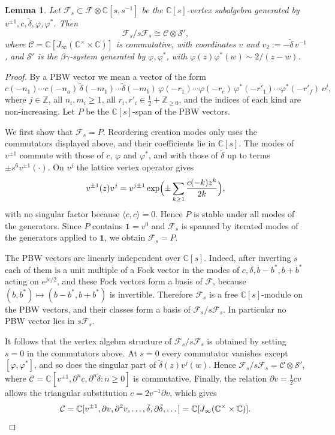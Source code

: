 \documentclass[11pt]{amsart}
\newtheorem{lemma}[theorem]{Lemma}
\theoremstyle{definition}
\theoremstyle{remark}
\begin{document}
{{\begin{lemma}\label{lem:fam}
	Let $\mathcal{F}_s\subset\mathcal{F}\otimes\mathbb{C}[s,s^{-1}]$ be the $\mathbb{C}[s]$-vertex
	subalgebra generated by $v^{\pm1},c,\tilde\delta,\varphi,\varphi^*$. Then
	\[
	\mathcal{F}_s/s\mathcal{F}_s\cong\mathcal{C}\otimes\mathcal{S}',
	\]
	where $\mathcal{C}=\mathbb{C}[J_\infty(\mathbb{C}^\times\times\mathbb{C})]$ is commutative, with
	coordinates $v$ and $v_2:=-\tilde\delta\,v^{-1}$, and $\mathcal{S}'$ is the
	$\beta\gamma$-system generated by $\varphi,\varphi^*$, with $\varphi(z)\varphi^*(w)\sim2/(z-w)$.
\end{lemma}
\begin{proof}
	By a PBW vector we mean a vector of the form
	\[
	c(-n_1)\cdots c(-n_a)\,\tilde\delta(-m_1)\cdots\tilde\delta(-m_b)\,
	\varphi(-r_1)\cdots\varphi(-r_e)\,\varphi^*(-r'_1)\cdots\varphi^*(-r'_f)\,v^{j},
	\]
	where $j\in\mathbb{Z}$, all $n_i,m_i\ge1$, all $r_i,r'_i\in\tfrac12+\mathbb{Z}_{\ge0}$, and the
	indices of each kind are non-increasing. Let $P$ be the $\mathbb{C}[s]$-span of the PBW vectors.
	
	We first show that $\mathcal{F}_s=P$. Reordering creation modes only uses the commutators
	displayed above, and their coefficients lie in $\mathbb{C}[s]$. The modes of $v^{\pm1}$ commute
	with those of $c$, $\varphi$ and $\varphi^*$, and with those of $\tilde\delta$ up to terms
	$\pm s^6v^{\pm1}(\cdot)$. On $v^j$ the lattice vertex operator gives
	\[
	v^{\pm1}(z)v^j=v^{j\pm1}\exp\Bigl(\pm\sum_{k\ge1}\frac{c(-k)z^k}{2k}\Bigr),
	\]
	with no singular factor because $\langle c,c\rangle=0$. Hence $P$ is stable under all modes of
	the generators. Since $P$ contains $\mathbf 1=v^0$ and $\mathcal{F}_s$ is spanned by iterated
	modes of the generators applied to $\mathbf 1$, we obtain $\mathcal{F}_s=P$.
	
	The PBW vectors are linearly independent over $\mathbb{C}[s]$. Indeed, after inverting $s$ each
	of them is a unit multiple of a Fock vector in the modes of $c,\delta,b-b^*,b+b^*$ acting on
	$e^{jc/2}$, and these Fock vectors form a basis of $\mathcal{F}$, because
	$(b,b^*)\mapsto(b-b^*,b+b^*)$ is invertible. Therefore $\mathcal{F}_s$ is a free
	$\mathbb{C}[s]$-module on the PBW vectors, and their classes form a basis of
	$\mathcal{F}_s/s\mathcal{F}_s$. In particular no PBW vector lies in $s\mathcal{F}_s$.
	
	It follows that the vertex algebra structure of $\mathcal{F}_s/s\mathcal{F}_s$ is obtained by
	setting $s=0$ in the commutators above. At $s=0$ every commutator vanishes except
	$[\varphi,\varphi^*]$, and so does the singular part of $\tilde\delta(z)v^j(w)$. Hence
	$\mathcal{F}_s/s\mathcal{F}_s=\mathcal{C}\otimes\mathcal{S}'$, where
	$\mathcal{C}=\mathbb{C}[v^{\pm1},\partial^nc,\partial^n\tilde\delta:n\ge0]$ is commutative.
	Finally, the relation $\partial v=\tfrac12cv$ allows the triangular substitution
	$c=2v^{-1}\partial v$, which gives
	\[
	\mathcal{C}=\mathbb{C}[v^{\pm1},\partial v,\partial^2v,\dots,\tilde\delta,\partial\tilde\delta,\dots]
	=\mathbb{C}[J_\infty(\mathbb{C}^\times\times\mathbb{C})]. \qedhere
	\]
\end{proof}

}}
\end{document}
